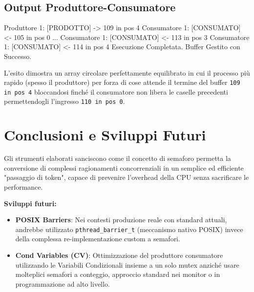 \documentclass[a4paper,12pt]{article}
\begin{document}
\subsection{Output Produttore-Consumatore}
\begin{terminal}
Produttore 1: [PRODOTTO] -> 109 in pos 4
Consumatore 1: [CONSUMATO] <- 105 in pos 0
...
Consumatore 1: [CONSUMATO] <- 113 in pos 3
Consumatore 1: [CONSUMATO] <- 114 in pos 4
Esecuzione Completata. Buffer Gestito con Successo.
\end{terminal}
L'esito dimostra un array circolare perfettamente equilibrato in cui il processo più rapido (spesso il produttore) per forza di cose attende il termine del buffer \texttt{109 in pos 4} bloccandosi finché il consumatore non libera le caselle precedenti permettendogli l'ingresso \texttt{110 in pos 0}. 

\section{Conclusioni e Sviluppi Futuri}
Gli strumenti elaborati sanciscono come il concetto di semaforo permetta la conversione di complessi ragionamenti concorrenziali in un semplice ed efficiente "passaggio di token", capace di prevenire l'overhead della CPU senza sacrificare le performance.

\noindent \textbf{Sviluppi futuri:}
\begin{itemize}
    \item \textbf{POSIX Barriers}: Nei contesti produzione reale con standard attuali, andrebbe utilizzato \texttt{pthread\_barrier\_t} (meccanismo nativo POSIX) invece della complessa re-implementazione custom a semafori.
    \item \textbf{Cond Variables (CV)}: Ottimizzazione del produttore consumatore utilizzando le Variabili Condizionali insieme a un solo mutex anziché usare molteplici semafori a conteggio, approccio standard nei monitor o in programmazione ad alto livello.
\end{itemize}
\end{document}
